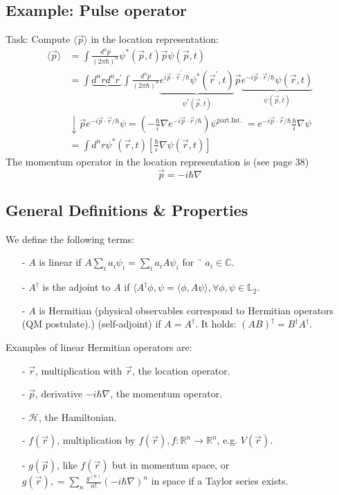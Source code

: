 \subsection{Example: Pulse operator}
Task: Compute $\langle\vec{p}\rangle$ in the location representation:
\begin{equation}
\begin{aligned}\langle\vec{p}\rangle &=\int \frac{d^{n} p}{(2 \pi \hbar)^{n}} \psi^{*}(\vec{p}, t) \vec{p} \psi(\vec{p}, t) \\ &=\int \underbrace{d^{n} r d^{n} r^{\prime}} \int \frac{d^{n} p}{(2 \pi \hbar)^{n}} \underbrace{e^{i \vec{p} \cdot \vec{r}^{\prime} / \hbar} \psi^{*}\left(\vec{r}^{\prime}, t\right)}_{\psi^{*}(\vec{p}, t)} \vec{p} \underbrace{e^{-i \vec{p} \cdot \vec{r} / \hbar} \psi(\vec{r}, t)}_{\psi(\vec{p}, t)} \\ & \downarrow \vec{p} e^{-i \vec{p} \cdot \vec{r} / \hbar} \psi=\left(-\frac{\hbar}{i} \nabla e^{-i \vec{p} \cdot \vec{r} / \hbar}\right) \psi^{\text {part.Int. }}= e^{-i \vec{p} \cdot \vec{r} / \hbar} \frac{\hbar}{i} \nabla \psi \\ &=\int d^{n} r \psi^{*}(\vec{r}, t)\left[\frac{\hbar}{i} \nabla \psi(\vec{r}, t)\right] \end{aligned}
\end{equation}
The momentum operator in the location representation is (see page 38)
\begin{equation}
    \vec{p}=-i\hbar\nabla
\end{equation}
\subsection{General Definitions \& Properties}
We define the following terms:
\begin{itemize}
    \item[-] $A$ is linear if          $A\sum_ia_i\psi_i=\sum_ia_iA\psi_i$ for ¨ $a_i \in \mathbb{C}$.
    \item[-] $A^{\dagger}$ is the adjoint to $A$ if $\langle A^{\dagger}\phi,\psi=\langle\phi,A\psi\rangle,\forall\phi,\psi\in\mathbb{L}_2$.
    \item[-] $A$ is Hermitian (physical observables correspond to Hermitian operators (QM postulate).) (self-adjoint) if $A=A^{\dagger}$. It holds: $(AB)^{\dagger}=B^{\dagger}A^{\dagger}$.
\end{itemize}
Examples of linear Hermitian operators are:
\begin{itemize}
    \item[-] $\vec{r}$, multiplication with $\vec{r}$, the location operator.
    \item[-] $\vec{p}$, derivative $-i\hbar\nabla$, the momentum operator.
    \item[-] $\mathcal{H}$, the Hamiltonian.
    \item[-] $f(\vec{r})$, multiplication by $f(\vec{r}),f:\mathbb{R}^n\to\mathbb{R}^n$, e.g. $V(\vec{r})$.
    \item[-] $g(\vec{p})$, like $f(\vec{r})$ but in momentum space, or $g(\vec{r}),=\sum_n\frac{g^{(n)}}{n!}(-i\hbar\nabla)^n$ in space if a Taylor series exists.
\end{itemize}

